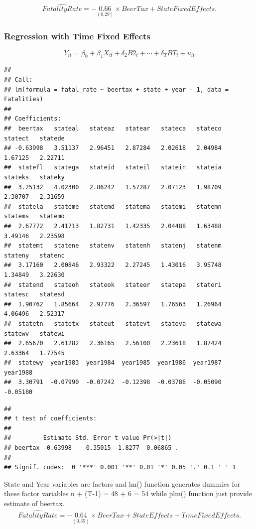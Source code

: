 \documentclass[
]{article}
\begin{document}
\[\begin{align}
\widehat{FatalityRate} = -\underset{(0.29)}{0.66} \times BeerTax + StateFixedEffects. \tag{10.7}
\end{align}\]

\hypertarget{regression-with-time-fixed-effects}{%
\subsubsection{Regression with Time Fixed
Effects}\label{regression-with-time-fixed-effects}}

\[Y_{it} = \beta_0 + \beta_1 X_{it} + \delta_2 B2_t + \cdots + \delta_T BT_t + u_{it}\]

\begin{verbatim}
## 
## Call:
## lm(formula = fatal_rate ~ beertax + state + year - 1, data = Fatalities)
## 
## Coefficients:
##  beertax   stateal   stateaz   statear   stateca   stateco   statect   statede  
## -0.63998   3.51137   2.96451   2.87284   2.02618   2.04984   1.67125   2.22711  
##  statefl   statega   stateid   stateil   statein   stateia   stateks   stateky  
##  3.25132   4.02300   2.86242   1.57287   2.07123   1.98709   2.30707   2.31659  
##  statela   stateme   statemd   statema   statemi   statemn   statems   statemo  
##  2.67772   2.41713   1.82731   1.42335   2.04488   1.63488   3.49146   2.23598  
##  statemt   statene   statenv   statenh   statenj   statenm   stateny   statenc  
##  3.17160   2.00846   2.93322   2.27245   1.43016   3.95748   1.34849   3.22630  
##  statend   stateoh   stateok   stateor   statepa   stateri   statesc   statesd  
##  1.90762   1.85664   2.97776   2.36597   1.76563   1.26964   4.06496   2.52317  
##  statetn   statetx   stateut   statevt   stateva   statewa   statewv   statewi  
##  2.65670   2.61282   2.36165   2.56100   2.23618   1.87424   2.63364   1.77545  
##  statewy  year1983  year1984  year1985  year1986  year1987  year1988  
##  3.30791  -0.07990  -0.07242  -0.12398  -0.03786  -0.05090  -0.05180
\end{verbatim}

\begin{verbatim}
## 
## t test of coefficients:
## 
##         Estimate Std. Error t value Pr(>|t|)  
## beertax -0.63998    0.35015 -1.8277  0.06865 .
## ---
## Signif. codes:  0 '***' 0.001 '**' 0.01 '*' 0.05 '.' 0.1 ' ' 1
\end{verbatim}

State and Year variables are factors and lm() function generates dummies
for these factor variables n + (T-1) = 48 + 6 = 54 while plm() function
just provide estimate of beertax. \[\begin{align}
\widehat{FatalityRate} =  -\underset{(0.35)}{0.64} \times BeerTax + StateEffects + TimeFixedEffects. \tag{10.8}
\end{align}\]
\end{document}
